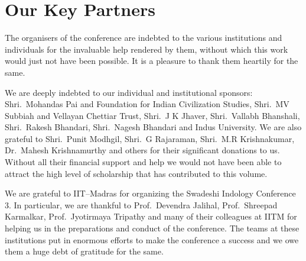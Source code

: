 
\chapter*{Our Key Partners}\label{keypartners}

The organisers of the conference are indebted to the various institutions and individuals for the invaluable help rendered by them, without which this work would just not have been possible. It is a pleasure to thank them heartily for the same.

We are deeply indebted to our individual and institutional sponsors: Shri.\ Mohandas Pai and Foundation for Indian Civilization Studies, Shri.\ MV Subbiah and Vellayan Chettiar Trust, Shri.\ J K Jhaver, Shri.\ Vallabh Bhanshali, Shri.\ Rakesh Bhandari, Shri.\ Nagesh Bhandari and Indus University. We are also grateful to Shri.\ Punit Modhgil, Shri.\ G Rajaraman, Shri.\ M.R Krishnakumar, Dr.\ Mahesh Krishnamurthy and others for their significant donations to us. Without all their financial support and help we would not have been able to attract the high level of scholarship that has contributed to this volume.

We are grateful to IIT–Madras for organizing the Swadeshi Indology Conference 3. In particular, we are thankful to Prof.\ Devendra Jalihal, Prof.\ Shreepad Karmalkar, Prof.\ Jyotirmaya Tripathy and many of their colleagues at IITM for helping us in the preparations and conduct of the conference. The teams at these institutions put in enormous efforts to make the conference a success and we owe them a huge debt of gratitude for the same.

